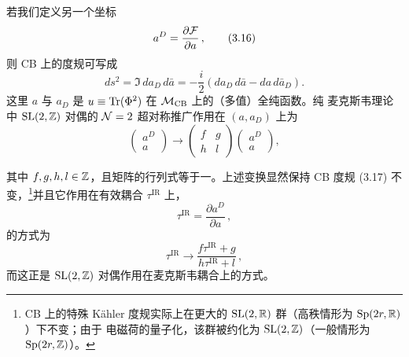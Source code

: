 若我们定义另一个坐标
\begin{equation}
  a^D = \frac{\partial\mathcal{F}}{\partial a}\,,
  \tag{3.16}
\end{equation}
则 CB 上的度规可写成
\begin{equation}
  ds^2 = \Im\,da_D\,d\bar a = -\frac{i}{2}\left(da_D\,d\bar a - da\,d\bar a_D\right).
  \tag{3.17}
\end{equation}
这里 $a$ 与 $a_D$ 是 $u\equiv\operatorname{Tr}(\Phi^2)$ 在 $\mathcal{M}_{\mathrm{CB}}$ 上的（多值）全纯函数。纯
麦克斯韦理论中 $\mathrm{SL}(2,\mathbb{Z})$ 对偶的 $\mathcal{N}=2$ 超对称推广作用在 $(a,a_D)$ 上为
\begin{equation}
  \begin{pmatrix} a^D\\[2pt] a\end{pmatrix}\to
  \begin{pmatrix} f & g\\[2pt] h & l\end{pmatrix}
  \begin{pmatrix} a^D\\[2pt] a\end{pmatrix},
  \tag{3.18}
\end{equation}


其中 $f,g,h,l\in\mathbb{Z}$，且矩阵的行列式等于一。上述变换显然保持 CB 度规 (3.17) 不变，\footnote{CB
上的特殊 Kähler 度规实际上在更大的 $\mathrm{SL}(2,\mathbb{R})$ 群（高秩情形为 $\mathrm{Sp}(2r,\mathbb{R})$）下不变；由于
电磁荷的量子化，该群被约化为 $\mathrm{SL}(2,\mathbb{Z})$（一般情形为 $\mathrm{Sp}(2r,\mathbb{Z})$）。}并且它作用在有效耦合
$\tau^{\mathrm{IR}}$ 上，
\begin{equation}
  \tau^{\mathrm{IR}} = \frac{\partial a^D}{\partial a}\,,
  \tag{3.19}
\end{equation}
的方式为
\begin{equation}
  \tau^{\mathrm{IR}}\to\frac{f\tau^{\mathrm{IR}}+g}{h\tau^{\mathrm{IR}}+l}\,,
  \tag{3.20}
\end{equation}
而这正是 $\mathrm{SL}(2,\mathbb{Z})$ 对偶作用在麦克斯韦耦合上的方式。


